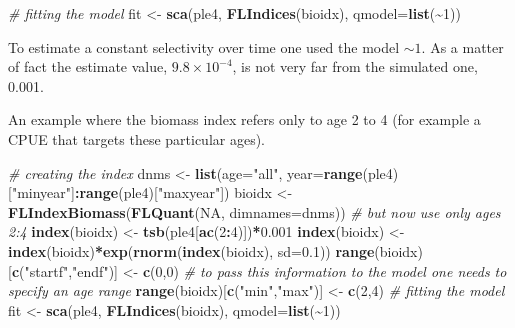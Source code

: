 \documentclass[
]{book}
\newenvironment{Shaded}{\begin{snugshade}}{\end{snugshade}}
\newcommand{\AttributeTok}[1]{\textcolor[rgb]{0.13,0.29,0.53}{#1}}
\newcommand{\CommentTok}[1]{\textcolor[rgb]{0.56,0.35,0.01}{\textit{#1}}}
\newcommand{\ConstantTok}[1]{\textcolor[rgb]{0.56,0.35,0.01}{#1}}
\newcommand{\DecValTok}[1]{\textcolor[rgb]{0.00,0.00,0.81}{#1}}
\newcommand{\FloatTok}[1]{\textcolor[rgb]{0.00,0.00,0.81}{#1}}
\newcommand{\FunctionTok}[1]{\textcolor[rgb]{0.13,0.29,0.53}{\textbf{#1}}}
\newcommand{\NormalTok}[1]{#1}
\newcommand{\OtherTok}[1]{\textcolor[rgb]{0.56,0.35,0.01}{#1}}
\newcommand{\SpecialCharTok}[1]{\textcolor[rgb]{0.81,0.36,0.00}{\textbf{#1}}}
\newcommand{\StringTok}[1]{\textcolor[rgb]{0.31,0.60,0.02}{#1}}
\begin{document}
\begin{Shaded}
\begin{Highlighting}[]
\CommentTok{\# fitting the model}
\NormalTok{fit }\OtherTok{\textless{}{-}} \FunctionTok{sca}\NormalTok{(ple4, }\FunctionTok{FLIndices}\NormalTok{(bioidx), }\AttributeTok{qmodel=}\FunctionTok{list}\NormalTok{(}\SpecialCharTok{\textasciitilde{}}\DecValTok{1}\NormalTok{))}
\end{Highlighting}
\end{Shaded}

To estimate a constant selectivity over time one used the model \(\sim 1\). As a matter of fact the estimate value, \ensuremath{9.8\times 10^{-4}}, is not very far from the simulated one, 0.001.

An example where the biomass index refers only to age 2 to 4 (for example a CPUE that targets these particular ages).

\begin{Shaded}
\begin{Highlighting}[]
\CommentTok{\# creating the index}
\NormalTok{dnms }\OtherTok{\textless{}{-}} \FunctionTok{list}\NormalTok{(}\AttributeTok{age=}\StringTok{"all"}\NormalTok{, }\AttributeTok{year=}\FunctionTok{range}\NormalTok{(ple4)[}\StringTok{"minyear"}\NormalTok{]}\SpecialCharTok{:}\FunctionTok{range}\NormalTok{(ple4)[}\StringTok{"maxyear"}\NormalTok{])}
\NormalTok{bioidx }\OtherTok{\textless{}{-}} \FunctionTok{FLIndexBiomass}\NormalTok{(}\FunctionTok{FLQuant}\NormalTok{(}\ConstantTok{NA}\NormalTok{, }\AttributeTok{dimnames=}\NormalTok{dnms))}
\CommentTok{\# but now use only ages 2:4}
\FunctionTok{index}\NormalTok{(bioidx) }\OtherTok{\textless{}{-}} \FunctionTok{tsb}\NormalTok{(ple4[}\FunctionTok{ac}\NormalTok{(}\DecValTok{2}\SpecialCharTok{:}\DecValTok{4}\NormalTok{)])}\SpecialCharTok{*}\FloatTok{0.001}
\FunctionTok{index}\NormalTok{(bioidx) }\OtherTok{\textless{}{-}} \FunctionTok{index}\NormalTok{(bioidx)}\SpecialCharTok{*}\FunctionTok{exp}\NormalTok{(}\FunctionTok{rnorm}\NormalTok{(}\FunctionTok{index}\NormalTok{(bioidx), }\AttributeTok{sd=}\FloatTok{0.1}\NormalTok{))}
\FunctionTok{range}\NormalTok{(bioidx)[}\FunctionTok{c}\NormalTok{(}\StringTok{"startf"}\NormalTok{,}\StringTok{"endf"}\NormalTok{)] }\OtherTok{\textless{}{-}} \FunctionTok{c}\NormalTok{(}\DecValTok{0}\NormalTok{,}\DecValTok{0}\NormalTok{)}
\CommentTok{\# to pass this information to the model one needs to specify an age range}
\FunctionTok{range}\NormalTok{(bioidx)[}\FunctionTok{c}\NormalTok{(}\StringTok{"min"}\NormalTok{,}\StringTok{"max"}\NormalTok{)] }\OtherTok{\textless{}{-}} \FunctionTok{c}\NormalTok{(}\DecValTok{2}\NormalTok{,}\DecValTok{4}\NormalTok{)}
\CommentTok{\# fitting the model}
\NormalTok{fit }\OtherTok{\textless{}{-}} \FunctionTok{sca}\NormalTok{(ple4, }\FunctionTok{FLIndices}\NormalTok{(bioidx), }\AttributeTok{qmodel=}\FunctionTok{list}\NormalTok{(}\SpecialCharTok{\textasciitilde{}}\DecValTok{1}\NormalTok{))}
\end{Highlighting}
\end{Shaded}
\end{document}
